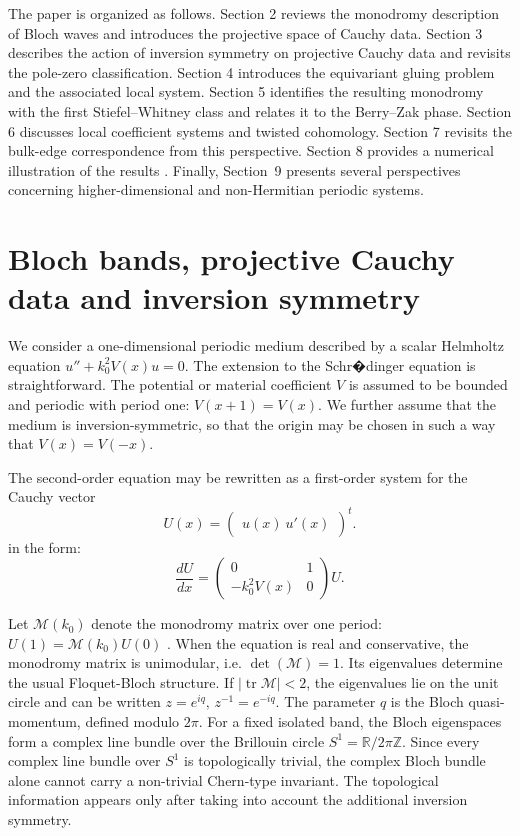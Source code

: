 \documentclass[preprint,12pt]{elsarticle}
\def\calM{{\mathcal  M}}
\def\bbR{\mathbb R}
\def\bbZ{\mathbb Z}
\begin{document}
The paper is organized as follows. Section 2 reviews the monodromy description of Bloch waves and introduces the projective space of Cauchy data. Section 3 describes the action of inversion symmetry on projective Cauchy data and revisits the pole-zero classification. Section 4 introduces the equivariant gluing problem and the associated local system. Section 5 identifies the resulting monodromy with the first Stiefel--Whitney class and relates it to the Berry--Zak phase. Section 6 discusses local coefficient systems and twisted cohomology. Section 7 revisits the bulk-edge correspondence from this perspective. Section 8 provides a numerical illustration of the results . Finally, Section~9 presents several perspectives concerning higher-dimensional and non-Hermitian periodic systems.
\section{Bloch bands, projective Cauchy data and inversion symmetry}

We consider a one-dimensional periodic medium described by a scalar Helmholtz equation
$u''+k_0^2V(x)u=0$. The extension to the Schr�dinger equation is straightforward.
The potential or material coefficient $V$ is assumed to be bounded and periodic with period one:
$V(x+1)=V(x)$.
We further assume that the medium is inversion-symmetric, so that the origin may be chosen in such a way that
$V(x)=V(-x)$.

The second-order equation may be rewritten as a first-order system for the Cauchy vector
$$
U(x)=
\begin{pmatrix}
u(x)\
u'(x)
\end{pmatrix}^t.
$$
in the form:
$$
\frac{dU}{dx}
=
\begin{pmatrix}
0&1\\
-k_0^2V(x)&0
\end{pmatrix}
U.
$$

Let $\calM(k_0)$ denote the monodromy matrix over one period: $U(1)=\calM(k_0) U(0)$ \cite{felbacq1998,felbacq2003}.
When the equation is real and conservative, the monodromy matrix is unimodular, i.e. $\det(\calM)=1$. Its eigenvalues determine the usual Floquet-Bloch structure. If $|\operatorname{tr}\calM|<2$, the eigenvalues lie on the unit circle and can be written
$z=e^{iq},\, z^{-1}=e^{-iq}$.
The parameter $q$ is the Bloch quasi-momentum, defined modulo $2\pi$. For a fixed isolated band, the Bloch eigenspaces form a complex line bundle over the Brillouin circle $S^1=\bbR/2\pi \bbZ$.
Since every complex line bundle over $S^1$ is topologically trivial, the complex Bloch bundle alone cannot carry a non-trivial Chern-type invariant. The topological information appears only after taking into account the additional inversion symmetry.
\end{document}
